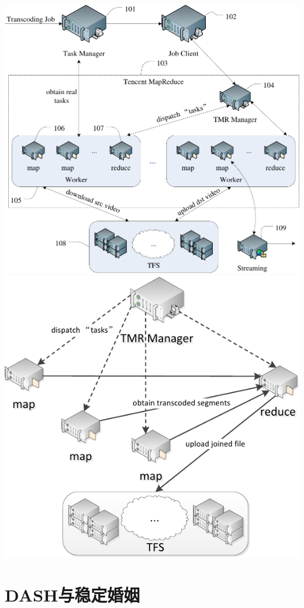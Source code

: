 \documentclass{beamer}
\begin{document}
\begin{frame}
\includegraphics[scale=0.33]{fig/TranscX.pdf}\hspace*{0.1cm}
\includegraphics[scale=0.33]{fig/TranscX_detail.pdf}
\end{frame}

\section{DASH与稳定婚姻}
\end{document}
